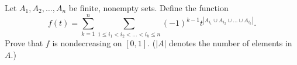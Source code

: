 \documentclass{article}
\begin{document}
\setlength{\parindent}{0pt}
Let $A_{1},A_{2},\dots,A_{n}$ be finite, nonempty sets. Define the function$$f(t)=\sum_{k=1}^{n}\sum_{1\le i_{1}<i_{2}<\dots<i_{k}\le n}(-1)^{k-1}t^{|A_{i_{1}}\cup A_{i_{2}}\cup\dots\cup A_{i_{k}}|}.$$Prove that $f$ is nondecreasing on $[0,1]$.\newline
($|A|$ denotes the number of elements in $A$.)
\end{document}
